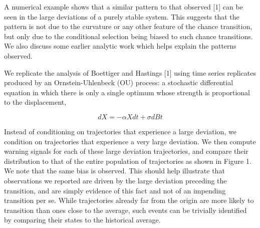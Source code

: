 \documentclass[review]{elsarticle} %
\begin{document}
A numerical example shows that a similar pattern to that observed
{[}1{]} can be seen in the large deviations of a purely stable system.
This suggests that the pattern is not due to the curvature or any other
feature of the chance transition, but only due to the conditional
selection being biased to such chance transitions. We also discuss some
earlier analytic work which helps explain the patterns observed.

We replicate the analysis of Boettiger and Hastings {[}1{]} using time
series replicates produced by an Ornstein-Uhlenbeck (OU) process: a
stochastic differential equation in which there is only a single optimum
whose strength is proportional to the displacement,

\[ dX = - \alpha X dt + \sigma dBt \]

Instead of conditioning on trajectories that experience a large
deviation, we condition on trajectories that experience a very large
deviation. We then compute warning signals for each of these large
deviation trajectories, and compare their distribution to that of the
entire population of trajectories as shown in Figure 1. We note that the
same bias is observed. This should help illustrate that observations we
reported are driven by the large deviation preceding the transition, and
are simply evidence of this fact and not of an impending transition per
se. While trajectories already far from the origin are more likely to
transition than ones close to the average, such events can be trivially
identified by comparing their states to the historical average.
\end{document}
